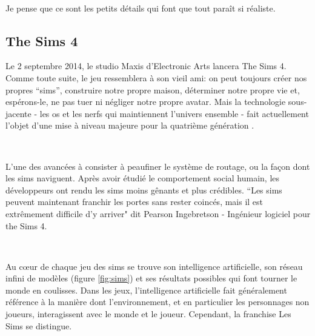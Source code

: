 ~\par
Je pense que ce sont les petits détails qui font que tout paraît si réaliste.




\subsection{The Sims 4}\label{sims4}

Le 2 septembre 2014, le studio Maxis d'Electronic Arts lancera The Sims 4. Comme toute suite, le jeu ressemblera à son vieil ami: on peut toujours créer nos propres “sims”, construire notre propre maison, déterminer notre propre vie et, espérons-le, ne pas tuer ni négliger notre propre avatar. Mais la technologie sous-jacente - les os et les nerfs qui maintiennent l’univers ensemble - fait actuellement l’objet d’une mise à niveau majeure pour la quatrième génération \parencite{simsArticle}.

~\par
L’une des avancées à consister à peaufiner le système de routage, ou la façon dont les sims naviguent. Après avoir étudié le comportement social humain, les développeurs ont rendu les sims moins gênants et plus crédibles. “Les sims peuvent maintenant franchir les portes sans rester coincés, mais il est extrêmement difficile d'y arriver" dit Pearson Ingebretson - Ingénieur logiciel pour the Sims 4. 

~\par
Au cœur de chaque jeu des sims se trouve son intelligence artificielle, son réseau infini de modèles (figure \ref{fig:sims}) et ses résultats possibles qui font tourner le monde en coulisses. Dans les jeux, l'intelligence artificielle fait généralement référence à la manière dont l'environnement, et en particulier les personnages non joueurs, interagissent avec le monde et le joueur. Cependant, la franchise Les Sims se distingue.

